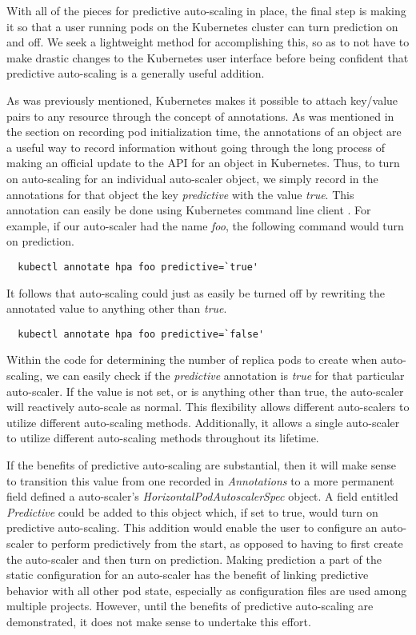 With all of the pieces for predictive auto-scaling in place, the final step is
making it so that a user running pods on the Kubernetes cluster can turn
prediction on and off. We seek a lightweight method for accomplishing this, so
as to not have to make drastic changes to the Kubernetes user interface before
being confident that predictive auto-scaling is a generally useful addition.

As was previously mentioned, Kubernetes makes it
possible to attach key/value pairs to any
resource through the concept of annotations. As was mentioned in the section on
recording pod initialization time, the annotations of an object are a useful way
to record information without going through the long process of making an
official update to the API for an object in Kubernetes. Thus, to turn on
auto-scaling for an individual auto-scaler object, we simply record in the annotations for
that object the key \textit{predictive} with the value \textit{true}. This
annotation can easily be done using Kubernetes command line
client \cite{k8s-kubectl-annotate}. For example,
if our auto-scaler had the name \textit{foo}, the following command would turn
on prediction.

\begin{verbatim}
  kubectl annotate hpa foo predictive=`true'
\end{verbatim}

It follows that auto-scaling could just as easily be turned off by rewriting the
annotated value to anything other than \textit{true}.

\begin{verbatim}
  kubectl annotate hpa foo predictive=`false'
\end{verbatim}

Within the code for determining the number of replica pods to create when
auto-scaling, we can easily check if the \textit{predictive} annotation is
\textit{true} for that particular auto-scaler. If the value is not set, or
is anything other than true, the auto-scaler will reactively auto-scale as normal.
This flexibility allows different auto-scalers to utilize different auto-scaling
methods. Additionally, it allows a single auto-scaler to utilize different
auto-scaling methods throughout its lifetime.

If the benefits of predictive auto-scaling are substantial, then it will make
sense to transition this value from one recorded in \textit{Annotations} to a
more permanent field defined a auto-scaler's
\textit{HorizontalPodAutoscalerSpec} object. A field entitled
\textit{Predictive} could be added to this object which, if set to true, would
turn on predictive auto-scaling. This addition would enable the user to
configure an
auto-scaler to perform predictively from the start, as opposed to having to first
create the auto-scaler and then turn on prediction. Making prediction a part of
the static configuration for an auto-scaler has the benefit of linking predictive
behavior with all other pod state, especially as configuration files are used
among multiple projects. However, until the benefits of predictive
auto-scaling are demonstrated, it does not make sense to undertake this effort.
